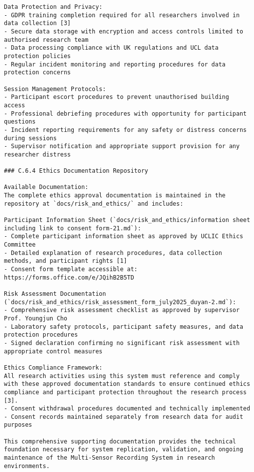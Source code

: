 \begin{verbatim}
Data Protection and Privacy:
- GDPR training completion required for all researchers involved in data collection [3]
- Secure data storage with encryption and access controls limited to authorised research team
- Data processing compliance with UK regulations and UCL data protection policies
- Regular incident monitoring and reporting procedures for data protection concerns

Session Management Protocols:
- Participant escort procedures to prevent unauthorised building access
- Professional debriefing procedures with opportunity for participant questions
- Incident reporting requirements for any safety or distress concerns during sessions
- Supervisor notification and appropriate support provision for any researcher distress

### C.6.4 Ethics Documentation Repository

Available Documentation:
The complete ethics approval documentation is maintained in the repository at `docs/risk_and_ethics/` and includes:

Participant Information Sheet (`docs/risk_and_ethics/information sheet including link to consent form-21.md`):
- Complete participant information sheet as approved by UCLIC Ethics Committee
- Detailed explanation of research procedures, data collection methods, and participant rights [1]
- Consent form template accessible at: https://forms.office.com/e/JQihB2B5TD

Risk Assessment Documentation (`docs/risk_and_ethics/risk_assessment_form_july2025_duyan-2.md`):
- Comprehensive risk assessment checklist as approved by supervisor Prof. Youngjun Cho
- Laboratory safety protocols, participant safety measures, and data protection procedures
- Signed declaration confirming no significant risk assessment with appropriate control measures

Ethics Compliance Framework:
All research activities using this system must reference and comply with these approved documentation standards to ensure continued ethics compliance and participant protection throughout the research process [3].
- Consent withdrawal procedures documented and technically implemented
- Consent records maintained separately from research data for audit purposes

This comprehensive supporting documentation provides the technical foundation necessary for system replication, validation, and ongoing maintenance of the Multi-Sensor Recording System in research environments.
\end{verbatim}
